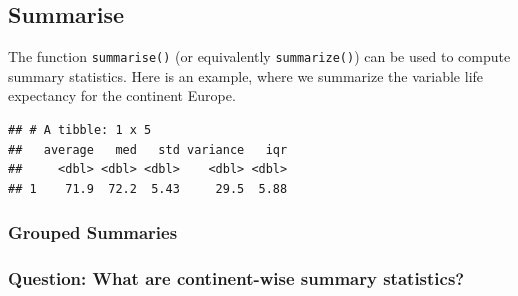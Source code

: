 \documentclass[]{article}
\newenvironment{Shaded}{\begin{snugshade}}{\end{snugshade}}
\newcommand{\KeywordTok}[1]{\textcolor[rgb]{0.13,0.29,0.53}{\textbf{#1}}}
\newcommand{\DataTypeTok}[1]{\textcolor[rgb]{0.13,0.29,0.53}{#1}}
\newcommand{\StringTok}[1]{\textcolor[rgb]{0.31,0.60,0.02}{#1}}
\newcommand{\OperatorTok}[1]{\textcolor[rgb]{0.81,0.36,0.00}{\textbf{#1}}}
\newcommand{\NormalTok}[1]{#1}
\begin{document}
\subsection{Summarise}\label{summarise}

The function \texttt{summarise()} (or equivalently \texttt{summarize()})
can be used to compute summary statistics. Here is an example, where we
summarize the variable life expectancy for the continent Europe.

\begin{Shaded}
\end{Shaded}

\begin{verbatim}
## # A tibble: 1 x 5
##   average   med   std variance   iqr
##     <dbl> <dbl> <dbl>    <dbl> <dbl>
## 1    71.9  72.2  5.43     29.5  5.88
\end{verbatim}

\subsubsection{Grouped Summaries}\label{grouped-summaries}

\subsubsection{Question: What are continent-wise summary
statistics?}\label{question-what-are-continent-wise-summary-statistics}

\begin{Shaded}
\end{Shaded}
\end{document}
